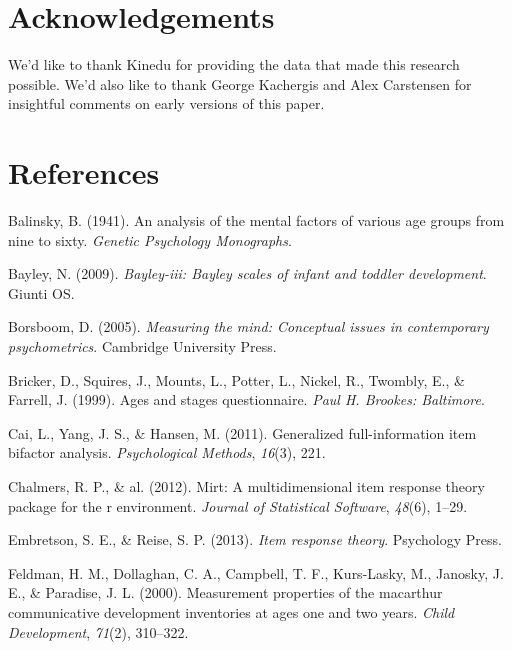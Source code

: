 \documentclass[10pt, letterpaper]{article}
\begin{document}
\hypertarget{acknowledgements}{%
\section{Acknowledgements}\label{acknowledgements}}

We'd like to thank Kinedu for providing the data that made this research
possible. We'd also like to thank George Kachergis and Alex Carstensen
for insightful comments on early versions of this paper.

\hypertarget{references}{%
\section{References}\label{references}}

\setlength{\parindent}{-0.1in} 
\setlength{\leftskip}{0.125in}

\noindent

\hypertarget{refs}{}
\leavevmode\hypertarget{ref-balinsky1941analysis}{}%
Balinsky, B. (1941). An analysis of the mental factors of various age
groups from nine to sixty. \emph{Genetic Psychology Monographs}.

\leavevmode\hypertarget{ref-bayley2009bayley}{}%
Bayley, N. (2009). \emph{Bayley-iii: Bayley scales of infant and toddler
development}. Giunti OS.

\leavevmode\hypertarget{ref-borsboom2005measuring}{}%
Borsboom, D. (2005). \emph{Measuring the mind: Conceptual issues in
contemporary psychometrics}. Cambridge University Press.

\leavevmode\hypertarget{ref-bricker1999ages}{}%
Bricker, D., Squires, J., Mounts, L., Potter, L., Nickel, R., Twombly,
E., \& Farrell, J. (1999). Ages and stages questionnaire. \emph{Paul H.
Brookes: Baltimore}.

\leavevmode\hypertarget{ref-cai2011generalized}{}%
Cai, L., Yang, J. S., \& Hansen, M. (2011). Generalized full-information
item bifactor analysis. \emph{Psychological Methods}, \emph{16}(3), 221.

\leavevmode\hypertarget{ref-chalmers2012mirt}{}%
Chalmers, R. P., \& al. (2012). Mirt: A multidimensional item response
theory package for the r environment. \emph{Journal of Statistical
Software}, \emph{48}(6), 1--29.

\leavevmode\hypertarget{ref-embretson2013item}{}%
Embretson, S. E., \& Reise, S. P. (2013). \emph{Item response theory}.
Psychology Press.

\leavevmode\hypertarget{ref-feldman2000measurement}{}%
Feldman, H. M., Dollaghan, C. A., Campbell, T. F., Kurs-Lasky, M.,
Janosky, J. E., \& Paradise, J. L. (2000). Measurement properties of the
macarthur communicative development inventories at ages one and two
years. \emph{Child Development}, \emph{71}(2), 310--322.
\end{document}
